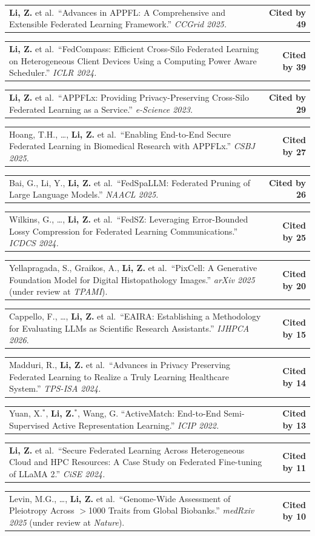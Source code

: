 \documentclass[letterpaper,11pt]{article}
\makeatletter
\newcommand{\CiteEntry}[2]{%
  \item \begin{tabularx}{\linewidth}[t]{@{}X@{\hspace{6pt}}r@{}}
    \small #1 & \small\textbf{Cited by #2}%
  \end{tabularx}%
}
\makeatother
\begin{document}
\begin{enumerate}[leftmargin=1cm, label={[\arabic*]}, itemsep=3pt]

  \CiteEntry{\textbf{Li, Z.} et al.\ ``Advances in APPFL: A Comprehensive and Extensible Federated Learning Framework.'' \textit{CCGrid 2025.}}{49}

  \CiteEntry{\textbf{Li, Z.} et al.\ ``FedCompass: Efficient Cross-Silo Federated Learning on Heterogeneous Client Devices Using a Computing Power Aware Scheduler.'' \textit{ICLR 2024.}}{39}

  \CiteEntry{\textbf{Li, Z.} et al.\ ``APPFLx: Providing Privacy-Preserving Cross-Silo Federated Learning as a Service.'' \textit{e-Science 2023.}}{29}

  \CiteEntry{Hoang, T.H., \ldots, \textbf{Li, Z.} et al.\ ``Enabling End-to-End Secure Federated Learning in Biomedical Research with APPFLx.'' \textit{CSBJ 2025.}}{27}

  \CiteEntry{Bai, G., Li, Y., \textbf{Li, Z.} et al.\ ``FedSpaLLM: Federated Pruning of Large Language Models.'' \textit{NAACL 2025.}}{26}

  \CiteEntry{Wilkins, G., \ldots, \textbf{Li, Z.} et al.\ ``FedSZ: Leveraging Error-Bounded Lossy Compression for Federated Learning Communications.'' \textit{ICDCS 2024.}}{25}

  \CiteEntry{Yellapragada, S., Graikos, A., \textbf{Li, Z.} et al.\ ``PixCell: A Generative Foundation Model for Digital Histopathology Images.'' \textit{arXiv 2025} (under review at \textit{TPAMI}).}{20}

  \CiteEntry{Cappello, F., \ldots, \textbf{Li, Z.} et al.\ ``EAIRA: Establishing a Methodology for Evaluating LLMs as Scientific Research Assistants.'' \textit{IJHPCA 2026}.}{15}

  \CiteEntry{Madduri, R., \textbf{Li, Z.} et al.\ ``Advances in Privacy Preserving Federated Learning to Realize a Truly Learning Healthcare System.'' \textit{TPS-ISA 2024.}}{14}
  
  \CiteEntry{Yuan, X.$^*$, \textbf{Li, Z.$^*$}, Wang, G. ``ActiveMatch: End-to-End Semi-Supervised Active Representation Learning.'' \textit{ICIP 2022.}}{13}  

  \CiteEntry{\textbf{Li, Z.} et al.\ ``Secure Federated Learning Across Heterogeneous Cloud and HPC Resources: A Case Study on Federated Fine-tuning of LLaMA 2.'' \textit{CiSE 2024.}}{11}

  \CiteEntry{Levin, M.G., \ldots, \textbf{Li, Z.} et al.\ ``Genome-Wide Assessment of Pleiotropy Across $>$1000 Traits from Global Biobanks.'' \textit{medRxiv 2025} (under review at \textit{Nature}).}{10}


\end{enumerate}
\end{document}
